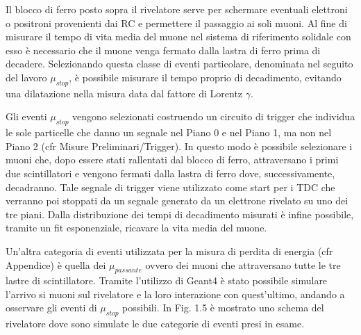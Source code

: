 \documentclass{standalone}
\begin{document}
Il blocco di ferro posto sopra il rivelatore serve per schermare eventuali elettroni o positroni provenienti dai RC e permettere il passaggio ai soli muoni.
Al fine di misurare il tempo di vita media del muone nel sistema di riferimento solidale con esso \`e necessario che il muone venga fermato dalla lastra di ferro prima di decadere. Selezionando questa classe di eventi particolare, denominata nel seguito del lavoro $\mu_{stop}$, \`e possibile misurare il tempo proprio di decadimento, evitando una dilatazione nella misura data dal fattore di Lorentz $\gamma$.

Gli eventi $\mu_{stop}$ vengono selezionati costruendo un circuito di trigger che individua le sole particelle che danno un segnale nel Piano 0 e nel Piano 1, ma non nel Piano 2 (cfr Misure Preliminari/Trigger). In questo modo \`e possibile selezionare i muoni che, dopo essere stati rallentati dal blocco di ferro, attraversano i primi due scintillatori e vengono fermati dalla lastra di ferro dove, successivamente, decadranno.
Tale segnale di trigger viene utilizzato come start per i TDC che verranno poi stoppati da un segnale generato da un elettrone rivelato su uno dei tre piani. Dalla distribuzione dei tempi di decadimento misurati \`e infine possibile, tramite un fit esponenziale, ricavare la vita media del muone.

Un'altra categoria di eventi utilizzata per la misura di perdita di energia (cfr Appendice) \`e quella dei $\mu_{passante}$ ovvero dei muoni che attraversano tutte le tre lastre di scintillatore. Tramite l'utilizzo di Geant4 è stato possibile simulare l'arrivo si muoni sul rivelatore e la loro interazione con quest'ultimo, andando a osservare gli eventi di $\mu_{stop}$ possibili. In Fig. 1.5 \`e mostrato uno schema del rivelatore dove sono simulate le due categorie di eventi presi in esame.
\end{document}
